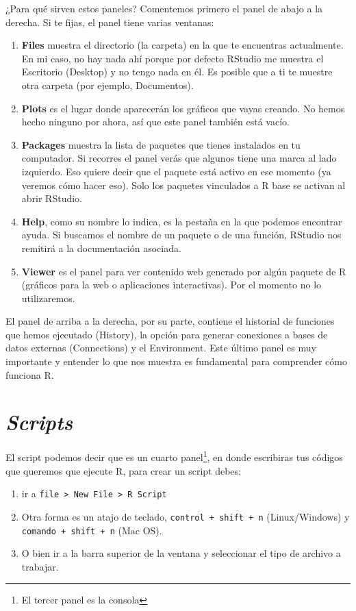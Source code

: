 \documentclass[12pt,]{book}
\providecommand{\tightlist}{%
  \setlength{\itemsep}{0pt}\setlength{\parskip}{0pt}}
\begin{document}
¿Para qué sirven estos paneles? Comentemos primero el panel de abajo a
la derecha. Si te fijas, el panel tiene varias ventanas:

\begin{enumerate}
\def\labelenumi{\arabic{enumi}.}
\item
  \textbf{Files} muestra el directorio (la carpeta) en la que te
  encuentras actualmente. En mi caso, no hay nada ahí porque por defecto
  RStudio me muestra el Escritorio (Desktop) y no tengo nada en él. Es
  posible que a ti te muestre otra carpeta (por ejemplo, Documentos).
\item
  \textbf{Plots} es el lugar donde aparecerán los gráficos que vayas
  creando. No hemos hecho ninguno por ahora, así que este panel también
  está vacío.
\item
  \textbf{Packages} muestra la lista de paquetes que tienes instalados
  en tu computador. Si recorres el panel verás que algunos tiene una
  marca al lado izquierdo. Eso quiere decir que el paquete está activo
  en ese momento (ya veremos cómo hacer eso). Solo los paquetes
  vinculados a R base se activan al abrir RStudio.
\item
  \textbf{Help}, como su nombre lo indica, es la pestaña en la que
  podemos encontrar ayuda. Si buscamos el nombre de un paquete o de una
  función, RStudio nos remitirá a la documentación asociada.
\item
  \textbf{Viewer} es el panel para ver contenido web generado por algún
  paquete de R (gráficos para la web o aplicaciones interactivas). Por
  el momento no lo utilizaremos.
\end{enumerate}

El panel de arriba a la derecha, por su parte, contiene el historial de
funciones que hemos ejecutado (History), la opción para generar
conexiones a bases de datos externas (Connections) y el Environment.
Este último panel es muy importante y entender lo que nos muestra es
fundamental para comprender cómo funciona R.

\section{\texorpdfstring{\emph{Scripts}}{Scripts}}\label{scripts}

El script podemos decir que es un cuarto panel\footnote{El tercer panel
  es la consola}, en donde escribiras tus códigos que queremos que
ejecute R, para crear un script debes:

\begin{enumerate}
\def\labelenumi{\arabic{enumi}.}
\tightlist
\item
  ir a
  \texttt{file\ \textgreater{}\ New\ File\ \textgreater{}\ R\ Script}
\item
  Otra forma es un atajo de teclado, \texttt{control\ +\ shift\ +\ n}
  (Linux/Windows) y \texttt{comando\ +\ shift\ +\ n} (Mac OS).
\item
  O bien ir a la barra superior de la ventana y seleccionar el tipo de
  archivo a trabajar.
\end{enumerate}
\end{document}
